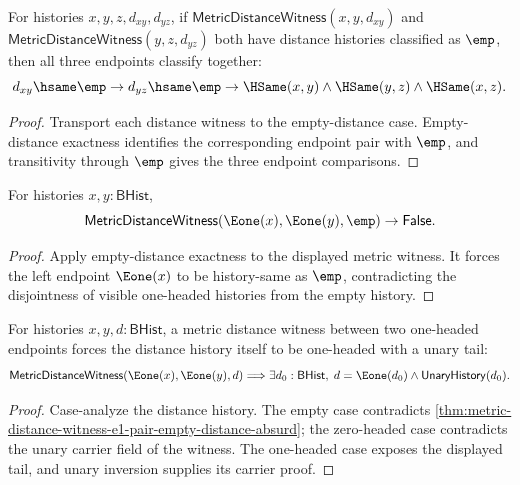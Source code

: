\begin{theorem}
\label{thm:metric-distance-witness-empty-distance-composite-endpoint-collapse}
For histories $x,y,z,d_{xy},d_{yz}$, if
$\mathsf{MetricDistanceWitness}(x,y,d_{xy})$ and
$\mathsf{MetricDistanceWitness}(y,z,d_{yz})$ both have distance histories
classified as $\emp$, then all three endpoints classify together:
$$
d_{xy}\hsame\emp\to d_{yz}\hsame\emp\to
\HSame(x,y)\wedge\HSame(y,z)\wedge\HSame(x,z).
$$
\end{theorem}
\begin{proof}
Transport each distance witness to the empty-distance case. Empty-distance
exactness identifies the corresponding endpoint pair with $\emp$, and
transitivity through $\emp$ gives the three endpoint comparisons.
\end{proof}

\begin{theorem}
\label{thm:metric-distance-witness-e1-pair-empty-distance-absurd}
For histories $x,y:\mathsf{BHist}$,
$$
\mathsf{MetricDistanceWitness}(\Eone(x),\Eone(y),\emp)\to\mathsf{False}.
$$
\end{theorem}
\begin{proof}
Apply empty-distance exactness to the displayed metric witness. It forces the
left endpoint $\Eone(x)$ to be history-same as $\emp$, contradicting the
disjointness of visible one-headed histories from the empty history.
\end{proof}

\begin{theorem}
\label{thm:metric-distance-witness-e1-endpoints-distance-e1-shape}
For histories $x,y,d:\mathsf{BHist}$, a metric distance witness between two
one-headed endpoints forces the distance history itself to be one-headed with a
unary tail:
$$
\mathsf{MetricDistanceWitness}(\Eone(x),\Eone(y),d)
\Longrightarrow
\exists d_0:\mathsf{BHist},\;
d=\Eone(d_0)\land\mathsf{UnaryHistory}(d_0).
$$
\end{theorem}
\begin{proof}
Case-analyze the distance history. The empty case contradicts
\autoref{thm:metric-distance-witness-e1-pair-empty-distance-absurd}; the
zero-headed case contradicts the unary carrier field of the witness. The
one-headed case exposes the displayed tail, and unary inversion supplies its
carrier proof.
\end{proof}

